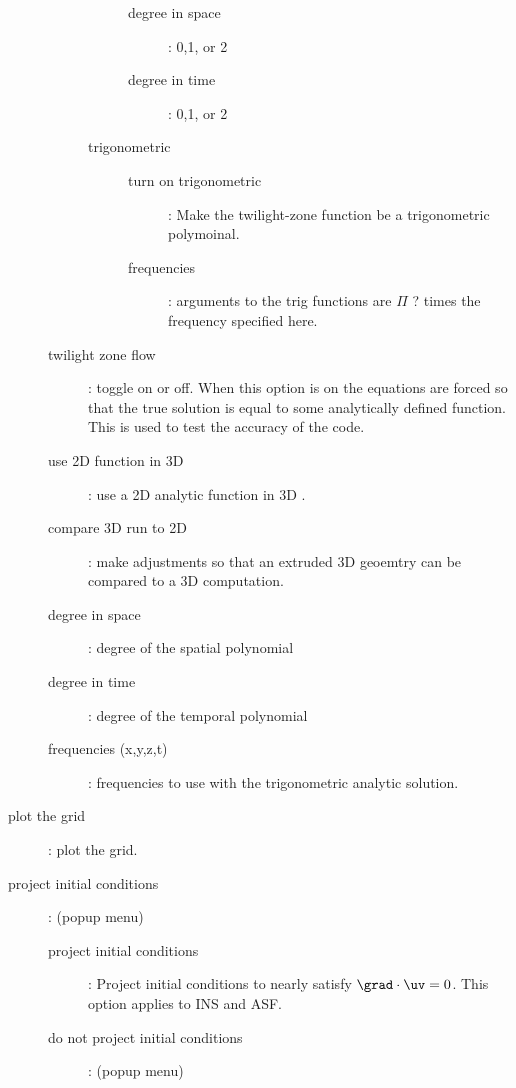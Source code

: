 \begin{description}
\begin{description}
\begin{description}
\begin{description}
           \item[degree in space] : 0,1, or 2
           \item[degree in time] : 0,1, or 2
         \end{description}
       \item[trigonometric]
         \begin{description}
           \item[turn on trigonometric] : Make the twilight-zone function be a trigonometric polymoinal.
           \item[frequencies] : arguments to the trig functions are $\Pi$ ? times the frequency
                specified here. 
         \end{description}
      \end{description}
    \item[twilight zone flow] : toggle on or off. When this option is on the equations are forced so that the true solution is
         equal to some analytically defined function. This is used to test the accuracy of the code.
     \item[use 2D function in 3D] : use a 2D analytic function in 3D .
     \item[compare 3D run to 2D] : make adjustments so that an extruded 3D geoemtry can be compared to a 3D computation.
     \item[degree in space] : degree of the spatial polynomial
     \item[degree in time] : degree of the temporal polynomial
     \item[frequencies (x,y,z,t)] : frequencies to use with the trigonometric analytic solution.
    \end{description}
  \item[plot the grid] : plot the grid.
  \item[project initial conditions] : (popup menu)
    \begin{description}
      \item[project initial conditions] : Project initial conditions to nearly satisfy $\grad\cdot\uv=0$. This
        option applies to INS and ASF.
      \item[do not project initial conditions] : (popup menu)
    \end{description}


\end{description}
